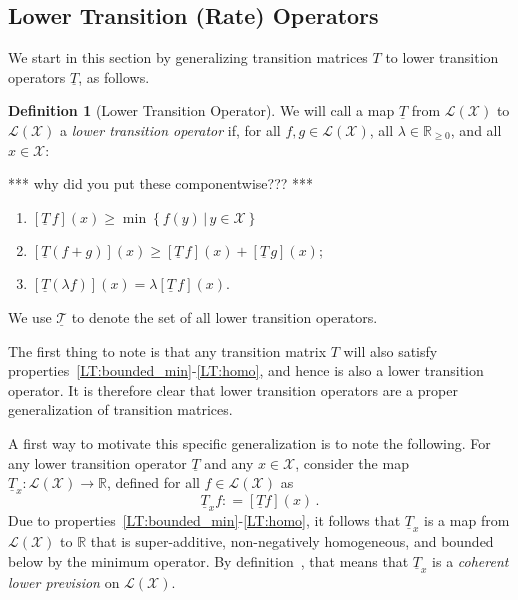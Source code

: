 \documentclass[10pt,a4paper]{paper}
\theoremstyle{definition}
\newtheorem{definition}{Definition}
\newcommand{\reals}{\mathbb{R}}
\newcommand{\realsnonneg}{\reals_{\geq 0}}
\newcommand{\states}{\mathcal{X}}
\newcommand{\lt}{\underline{T}}
\newcommand{\gambles}{\mathcal{L}}
\newcommand{\gamblesX}{\gambles(\states)}
\newcommand{\coloneqq}{:\!=}
\begin{document}
\subsection{Lower Transition (Rate) Operators}

We start in this section by generalizing transition matrices $T$ to lower transition operators $\lt$, as follows.

\begin{definition}[Lower Transition Operator]\label{def:coh_low_trans}
We will call a map $\lt$ from $\gamblesX$ to $\gamblesX$ a \emph{lower transition operator} if, for all $f,g\in\gamblesX$, all $\lambda\in\realsnonneg$, and all $x\in\states$:

*** why did you put these componentwise??? ***

\begin{enumerate}[label=LT\arabic*:,ref=LT\arabic*]
\item
$\left[\lt\,f\right](x)\geq\min\left\{f(y)\,\vert\,y\in\states\right\}$ \label{LT:bounded_min}
\item
$\left[\lt(f+g)\right](x)\geq \left[\lt\,f\right](x)+\left[\lt\,g\right](x)$; \label{LT:super_additive}
\item
$\left[\lt(\lambda f)\right](x)=\lambda\left[\lt\,f\right](x)$. \label{LT:homo}
\end{enumerate}
\noindent We use $\underline{\mathcal{T}}$ to denote the set of all lower transition operators.
\vspace{5pt}
\end{definition}
The first thing to note is that any transition matrix $T$ will also satisfy properties~\ref{LT:bounded_min}-\ref{LT:homo}, and hence is also a lower transition operator. It is therefore clear that lower transition operators are a proper generalization of transition matrices.

A first way to motivate this specific generalization is to note the following. For any lower transition operator $\lt$ and any $x\in\states$, consider the map $\lt_x:\gamblesX\to\reals$, defined for all $f\in\gamblesX$ as
\begin{equation}\label{eq:lowerprevisionfromlt}
\lt_xf \coloneqq \left[\lt f\right](x)\,.
\end{equation}
Due to properties~\ref{LT:bounded_min}-\ref{LT:homo}, it follows that $\lt_x$ is a map from $\gamblesX$ to $\reals$ that is super-additive, non-negatively homogeneous, and bounded below by the minimum operator. By definition~\cite[Definition~2.3.3]{Walley:1991vk}, that means that $\lt_x$ is a \emph{coherent lower prevision} on $\gamblesX$. 
\end{document}
